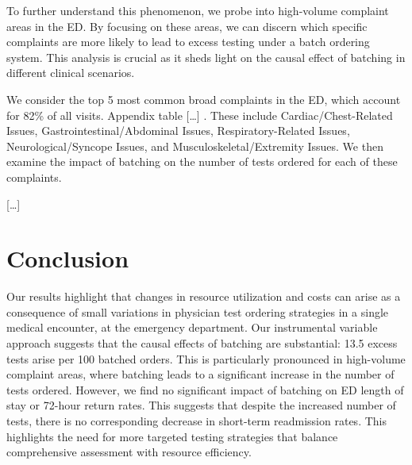 \documentclass[,,nonblindrev]{informs}
\begin{document}
To further understand this phenomenon, we probe into high-volume
complaint areas in the ED. By focusing on these areas, we can discern
which specific complaints are more likely to lead to excess testing
under a batch ordering system. This analysis is crucial as it sheds
light on the causal effect of batching in different clinical scenarios.

We consider the top 5 most common broad complaints in the ED, which
account for 82\% of all visits. Appendix table {[}\ldots{]} . These
include Cardiac/Chest-Related Issues, Gastrointestinal/Abdominal Issues,
Respiratory-Related Issues, Neurological/Syncope Issues, and
Musculoskeletal/Extremity Issues. We then examine the impact of batching
on the number of tests ordered for each of these complaints.

{[}\ldots{]}

\hypertarget{conclusion}{%
\section{Conclusion}\label{conclusion}}

Our results highlight that changes in resource utilization and costs can
arise as a consequence of small variations in physician test ordering
strategies in a single medical encounter, at the emergency department.
Our instrumental variable approach suggests that the causal effects of
batching are substantial: 13.5 excess tests arise per 100 batched
orders. This is particularly pronounced in high-volume complaint areas,
where batching leads to a significant increase in the number of tests
ordered. However, we find no significant impact of batching on ED length
of stay or 72-hour return rates. This suggests that despite the
increased number of tests, there is no corresponding decrease in
short-term readmission rates. This highlights the need for more targeted
testing strategies that balance comprehensive assessment with resource
efficiency.

\clearpage
\end{document}
